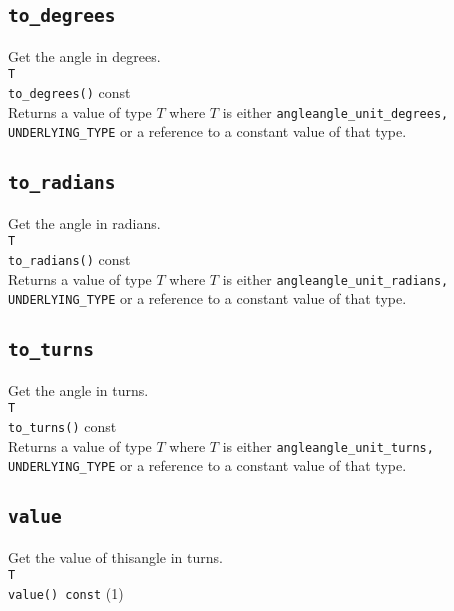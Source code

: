 \documentclass[oneside]{report}
\begin{document}
\subsection{\texttt{to\_degrees}}
Get the angle in degrees.\\

\noindent\texttt{T}\\
\texttt{to\_degrees}\texttt{()} const\\

\noindent{}Returns a value of type $T$ where $T$ is either
\texttt{angle\textlangle angle\_unit\_degrees, UNDERLYING\_TYPE\textrangle}
or a reference to a constant value of that type.

\subsection{\texttt{to\_radians}}
Get the angle in radians.\\

\noindent\texttt{T}\\
\texttt{to\_radians}\texttt{()} const\\

\noindent{}Returns a value of type $T$ where $T$ is either
\texttt{angle\textlangle angle\_unit\_radians, UNDERLYING\_TYPE\textrangle}
or a reference to a constant value of that type.

\subsection{\texttt{to\_turns}}
Get the angle in turns.\\

\noindent\texttt{T}\\
\texttt{to\_turns}\texttt{()} const\\

\noindent{}Returns a value of type $T$ where $T$ is either
\texttt{angle\textlangle angle\_unit\_turns, UNDERLYING\_TYPE\textrangle}
or a reference to a constant value of that type.

\subsection{\texttt{value}}
Get the value of thisangle in turns.\\

\noindent\texttt{T}\\
\texttt{value() const} (1)\\
\end{document}

